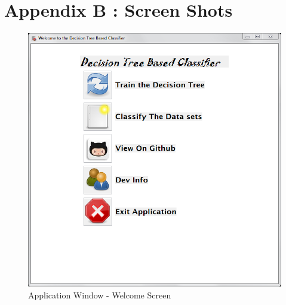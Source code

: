 \documentclass[12pt]{report}
\begin{document}
%

%


\newpage
\pagestyle{fancy}
\chead{}
\rfoot{\small{\thepage}}
\renewcommand{\headrulewidth}{0.4pt}
\renewcommand{\footrulewidth}{0.4pt}


\section*{Appendix B : Screen Shots}
\begin{figure}[h!]

  \centering
    \includegraphics[scale=0.40]{welcome_window.png}
  \caption{Application Window - Welcome Screen}
\end{figure}
\end{document}
